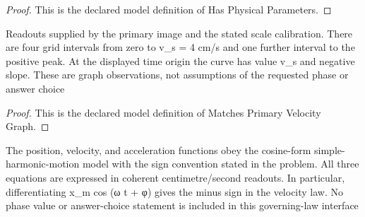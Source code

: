 \begin{proof}
  This is the declared model definition of Has Physical Parameters.
\end{proof}
\begin{definition}
  \label{def:physics:phyx-mini-0253:phyxminiproblems-problemphyxmini0253-matchesprimaryvelocitygraph}
  Readouts supplied by the primary image and the stated scale calibration. There are four grid intervals from zero to v\_s = 4 cm/s and one further interval to the positive peak. At the displayed time origin the curve has value v\_s and negative slope. These are graph observations, not assumptions of the requested phase or answer choice
\end{definition}
\begin{proof}
  This is the declared model definition of Matches Primary Velocity Graph.
\end{proof}
\begin{definition}
  \label{def:physics:phyx-mini-0253:phyxminiproblems-problemphyxmini0253-satisfiescosineharmonicoscillatorlaws}
  The position, velocity, and acceleration functions obey the cosine-form simple-harmonic-motion model with the sign convention stated in the problem. All three equations are expressed in coherent centimetre/second readouts. In particular, differentiating x\_m cos (ω t + φ) gives the minus sign in the velocity law. No phase value or answer-choice statement is included in this governing-law interface
\end{definition}
